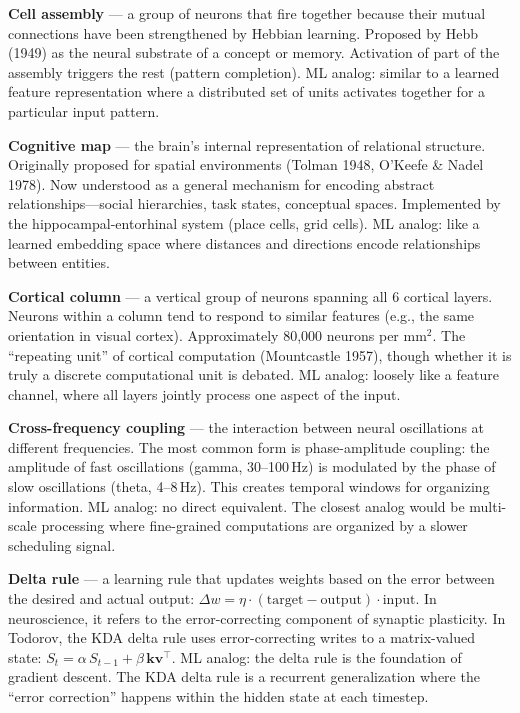 \documentclass[11pt,a4paper]{article}
\begin{document}
\textbf{Cell assembly} --- a group of neurons that fire together because their mutual connections have been strengthened by Hebbian learning. Proposed by Hebb (1949) as the neural substrate of a concept or memory. Activation of part of the assembly triggers the rest (pattern completion). ML analog: similar to a learned feature representation where a distributed set of units activates together for a particular input pattern.

\textbf{Cognitive map} --- the brain's internal representation of relational structure. Originally proposed for spatial environments (Tolman 1948, O'Keefe \& Nadel 1978). Now understood as a general mechanism for encoding abstract relationships---social hierarchies, task states, conceptual spaces. Implemented by the hippocampal-entorhinal system (place cells, grid cells). ML analog: like a learned embedding space where distances and directions encode relationships between entities.

\textbf{Cortical column} --- a vertical group of neurons spanning all 6 cortical layers. Neurons within a column tend to respond to similar features (e.g., the same orientation in visual cortex). Approximately 80,000 neurons per mm$^2$. The ``repeating unit'' of cortical computation (Mountcastle 1957), though whether it is truly a discrete computational unit is debated. ML analog: loosely like a feature channel, where all layers jointly process one aspect of the input.

\textbf{Cross-frequency coupling} --- the interaction between neural oscillations at different frequencies. The most common form is phase-amplitude coupling: the amplitude of fast oscillations (gamma, 30--100\,Hz) is modulated by the phase of slow oscillations (theta, 4--8\,Hz). This creates temporal windows for organizing information. ML analog: no direct equivalent. The closest analog would be multi-scale processing where fine-grained computations are organized by a slower scheduling signal.

\textbf{Delta rule} --- a learning rule that updates weights based on the error between the desired and actual output: $\Delta w = \eta \cdot (\mathrm{target} - \mathrm{output}) \cdot \mathrm{input}$. In neuroscience, it refers to the error-correcting component of synaptic plasticity. In Todorov, the KDA delta rule uses error-correcting writes to a matrix-valued state: $S_t = \alpha \, S_{t-1} + \beta \, \mathbf{k} \mathbf{v}^\top$. ML analog: the delta rule is the foundation of gradient descent. The KDA delta rule is a recurrent generalization where the ``error correction'' happens within the hidden state at each timestep.
\end{document}
